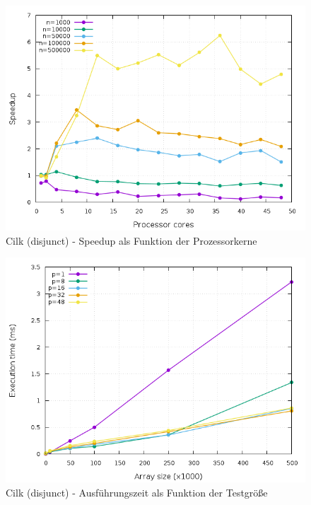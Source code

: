 \begin{figure}[p]
	\centering
	\includegraphics[width=404pt]{resources/plots/Cilk_Disjunct_sizes.png}
	\caption{Cilk (disjunct) - Speedup als Funktion der Prozessorkerne}
	\label{Cilk_Disjunct_sizes}
\end{figure}

\begin{figure}[p]
	\centering
	\includegraphics[width=404pt]{resources/plots/Cilk_Disjunct_cores.png}
	\caption{Cilk (disjunct) - Ausführungszeit als Funktion der Testgröße}
	\label{Cilk_Disjunct_cores}
\end{figure}

